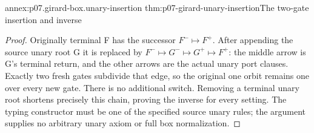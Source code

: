 \begin{annexitem}{annex:p07.girard-box.unary-insertion}
 {thm:p07-girard-unary-insertion}{The two-gate insertion and inverse}
\begin{proof}
Originally terminal F has the successor \(F^-\mapsto F^+\).
After appending the source unary root G it is replaced by
\(F^-\mapsto G^-\mapsto G^+\mapsto F^+\):
the middle arrow is G's terminal return, and the other arrows are
the actual unary port clauses. Exactly two fresh gates subdivide
that edge, so the original one orbit remains one over every new gate.
There is no additional switch. Removing a terminal unary root
shortens precisely this chain, proving the inverse for every setting.
The typing constructor must be one of the specified source unary
rules; the argument supplies no arbitrary unary axiom or full box
normalization.
\end{proof}
\end{annexitem}

